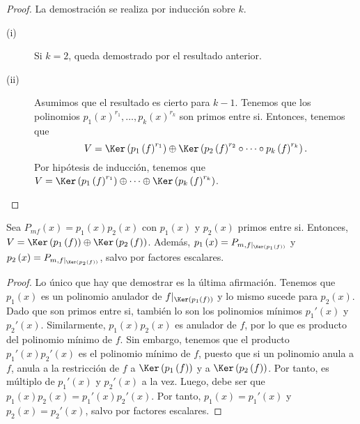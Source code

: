 \begin{proof}
La demostración se realiza por inducción sobre $\displaystyle k $. 
\begin{description}
\item[(i)] Si $\displaystyle k=2 $, queda demostrado por el resultado anterior.
\item[(ii)] Asumimos que el resultado es cierto para $\displaystyle k - 1 $. Tenemos que los polinomios $\displaystyle p_{1}\left(x\right)^{r_{1}}, \ldots, p_{k}\left(x\right)^{r_{k}} $ son primos entre si. Entonces, tenemos que
	\[ V = \Ker\left(p_{1}\left(f\right)^{r_{1}}\right) \oplus \Ker\left(p_{2}\left(f\right)^{r_{2}} \circ \cdots \circ p_{k}\left(f\right)^{r_{k}}\right) .\]
Por hipótesis de inducción, tenemos que $\displaystyle V = \Ker\left(p_{1}\left(f\right)^{r_{1}}\right) \oplus \cdots \oplus \Ker\left(p_{k}\left(f\right) ^{r_{k}}\right) $.
\end{description}
\end{proof}
\begin{fprop}[]
\normalfont Sea $\displaystyle P_{mf}\left(x\right) = p_{1}\left(x\right)p_{2}\left(x\right) $ con $\displaystyle p_{1}\left(x\right) $ y $\displaystyle p_{2}\left(x\right) $ primos entre si. Entonces, $\displaystyle V = \Ker\left(p_{1}\left(f\right)\right) \oplus \Ker\left(p_{2}\left(f\right)\right) $. Además, $\displaystyle p_{1}\left(x\right) = P_{m, f|_{\Ker\left(p_{1}\left(f\right)\right)}} $ y $\displaystyle p_{2}\left(x\right) = P_{m,f|_{\Ker\left(p_{2}\left(f\right)\right)}} $, salvo por factores escalares.
\end{fprop}
\begin{proof}
Lo único que hay que demostrar es la última afirmación. Tenemos que $\displaystyle p_{1}\left(x\right) $ es un polinomio anulador de $\displaystyle f|_{\Ker\left(p_{1}\left(f\right)\right)} $ y lo mismo sucede para $\displaystyle p_{2}\left(x\right) $. Dado que son primos entre si, también lo son los polinomios mínimos $\displaystyle p_{1}'\left(x\right) $ y $\displaystyle p_{2}'\left(x\right) $. Similarmente, $\displaystyle p_{1}\left(x\right)p_{2}\left(x\right) $ es anulador de $\displaystyle f $, por lo que es producto del polinomio mínimo de $\displaystyle f $. Sin embargo, tenemos que el producto $\displaystyle p_{1}'(x)p_{2}'\left(x\right) $ es el polinomio mínimo de $\displaystyle f $, puesto que si un polinomio anula a $\displaystyle f $, anula a la restricción de $\displaystyle f $ a $\displaystyle \Ker\left(p_{1}\left(f\right)\right) $ y a $\displaystyle \Ker\left(p_{2}\left(f\right)\right) $. 
Por tanto, es múltiplo de $\displaystyle p_{1}'\left(x\right) $ y $\displaystyle p_{2}'\left(x\right) $ a la vez. Luego, debe ser que $\displaystyle p_{1}\left(x\right) p_{2}\left(x\right) = p_{1}'\left(x\right)p_{2}'\left(x\right) $. Por tanto, $\displaystyle p_{1}\left(x\right) = p_{1}'\left(x\right) $ y $\displaystyle p_{2}\left(x\right) = p_{2}'\left(x\right) $, salvo por factores escalares.
\end{proof}
